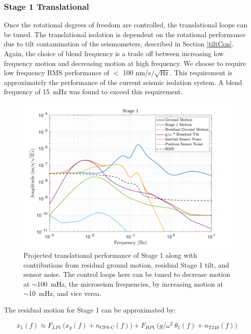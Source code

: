 \documentclass [12pt, proquest]{uwthesis}[2019]
\begin{document}
\subsubsection{Stage 1 Translational}

Once the rotational degrees of freedom are controlled, the translational loops can be tuned. The translational isolation is dependent on the rotational performance due to tilt contamination of the seismometers, described in Section \ref{tiltCon}. Again, the choice of blend frequency is a trade off between increasing low frequency motion and decreasing motion at high frequency. We choose to require low frequency RMS performance of $<$ 100 nm/s$/\sqrt{\text{Hz}}$. This requirement is approximately the performance of the current seismic isolation system. A blend frequency of 15~mHz was found to exceed this requirement. 


\begin{figure}[!h]
\begin{center}
\includegraphics[width=\textwidth]{cBRS_Model_ST1X.pdf}
\caption[Projected translational performance of Stage 1]{Projected translational performance of Stage 1 along with contributions from residual ground motion, residual Stage 1 tilt, and sensor noise.  The control loops here can be tuned to decrease motion at $\sim$100~mHz, the microseism frequencies, by increasing motion at $\sim$10~mHz, and vice versa.}
\label{cBRS1X}
\end{center}
\end{figure}

The residual motion for Stage 1 can be approximated by:

\begin{equation}
x_1(f)\approx F_{LP1}\ \big(x_g(f)+n_\text{CPS-C}(f)\big)+F_{HP1}\ \big( g/\omega^2\ \theta_1(f) +n_\text{T240}(f) \big)
\end{equation}
\end{document}
